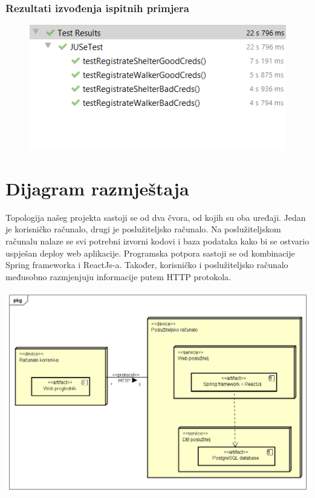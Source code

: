 		 \subsubsection{Rezultati izvođenja ispitnih primjera}
		 	\begin{figure}[H]
		 		\includegraphics[scale=0.75]{slike/SeleniumRezultati.PNG} %
		 		\centering
		 	\end{figure}
		 
		 
			
			\eject 
		
		
		\section{Dijagram razmještaja}
			
			
			
			\text Topologija našeg projekta sastoji se od dva čvora, od kojih su oba uređaji. Jedan je korisničko računalo, drugi je poslužiteljsko računalo. Na poslužiteljskom računalu nalaze se svi potrebni izvorni kodovi i baza podataka kako bi se ostvario uspješan deploy web aplikacije. Programska potpora sastoji se od kombinacije Spring frameworka i ReactJs-a. Također, korisničko i poslužiteljsko računalo međusobno razmjenjuju informacije putem HTTP protokola.
			
			\includegraphics[scale=0.5]{dijagrami/Dijagram razmjestaja.png}
			
